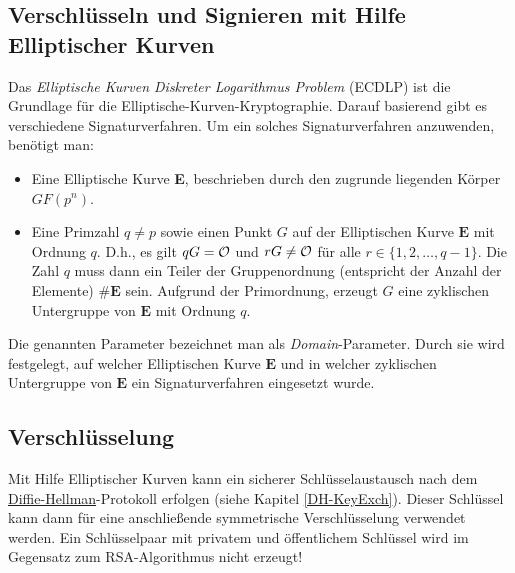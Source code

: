\begin{refsegment}
\section{Verschlüsseln und Signieren mit Hilfe Elliptischer Kurven}

\begin{sloppypar}
  Das {\em Elliptische Kurven Diskreter Logarithmus
    Problem} (ECDLP)  ist die
  Grundlage für die Elliptische-Kurven-Kryptographie. Darauf basierend gibt es verschiedene Signaturverfahren. Um ein solches Signaturverfahren anzuwenden, benötigt man:
\end{sloppypar}
\begin{itemize}
    \item Eine Elliptische Kurve \textbf{E}, beschrieben durch den zugrunde liegenden Körper $GF(p^n)$.
    \item Eine Primzahl $q\ne p$ sowie einen Punkt $G$ auf der Elliptischen Kurve $\textbf{E}$ mit Ordnung $q$. D.h., es gilt $qG={\cal O}$ und $rG\ne {\cal O}$ für alle $r\in \{1,2,\dots,q-1\}$. Die Zahl $q$ muss dann ein Teiler der Gruppenordnung (entspricht der Anzahl der Elemente) $\#\textbf{E}$ sein. Aufgrund der Primordnung, erzeugt $G$ eine zyklischen Untergruppe von $\textbf{E}$ mit Ordnung $q$.
\end{itemize}
Die genannten Parameter bezeichnet man als  {\em Domain}-Para\-meter. Durch sie wird
festgelegt, auf welcher Elliptischen Kurve $\textbf{E}$ und in welcher zyklischen Untergruppe von $\textbf{E}$ ein
Signaturverfahren eingesetzt  wurde.

\par
\subsection{Verschlüsselung}

Mit Hilfe Elliptischer Kurven kann ein sicherer Schlüsselaustausch nach dem \hyperlink{DH-KeyExch}{Diffie-Hellman}-Protokoll  erfolgen (siehe Kapitel \ref{DH-KeyExch}). Dieser Schlüssel kann dann für eine anschließende symmetrische Verschlüsselung verwendet werden. Ein Schlüsselpaar mit privatem und öffentlichem Schlüssel wird im Gegensatz zum RSA-Algorithmus nicht erzeugt!


\end{refsegment}
